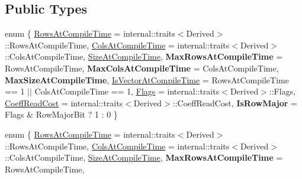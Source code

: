 \subsection*{Public Types}
\begin{DoxyCompactItemize}
\item 
enum \{ \newline
\hyperlink{class_eigen_1_1_skyline_matrix_base_a811ba3961cb927ae5fa84ed278ebceeaa22b71b821112b0ccf61b7317b9ac4cf4}{Rows\+At\+Compile\+Time} = internal\+:\+:traits$<$Derived$>$\+:\+:Rows\+At\+Compile\+Time, 
\hyperlink{class_eigen_1_1_skyline_matrix_base_a811ba3961cb927ae5fa84ed278ebceeaa0bb8b9ae248b86ca53aff754311111e8}{Cols\+At\+Compile\+Time} = internal\+:\+:traits$<$Derived$>$\+:\+:Cols\+At\+Compile\+Time, 
\hyperlink{class_eigen_1_1_skyline_matrix_base_a811ba3961cb927ae5fa84ed278ebceeaacd91cb554fe479f85ab5749902d89217}{Size\+At\+Compile\+Time}, 
{\bfseries Max\+Rows\+At\+Compile\+Time} = Rows\+At\+Compile\+Time, 
\newline
{\bfseries Max\+Cols\+At\+Compile\+Time} = Cols\+At\+Compile\+Time, 
{\bfseries Max\+Size\+At\+Compile\+Time}, 
\hyperlink{class_eigen_1_1_skyline_matrix_base_a811ba3961cb927ae5fa84ed278ebceeaaee4b494f83cfc99369a8364192c33f81}{Is\+Vector\+At\+Compile\+Time} = Rows\+At\+Compile\+Time == 1 $\vert$$\vert$ Cols\+At\+Compile\+Time == 1, 
\hyperlink{class_eigen_1_1_skyline_matrix_base_a811ba3961cb927ae5fa84ed278ebceeaa206a06da6112137d014c4ff4f199f546}{Flags} = internal\+:\+:traits$<$Derived$>$\+:\+:Flags, 
\newline
\hyperlink{class_eigen_1_1_skyline_matrix_base_a811ba3961cb927ae5fa84ed278ebceeaa2f2f2c74314a961757ff965e3b7df794}{Coeff\+Read\+Cost} = internal\+:\+:traits$<$Derived$>$\+:\+:Coeff\+Read\+Cost, 
{\bfseries Is\+Row\+Major} = Flags \& Row\+Major\+Bit ? 1 \+: 0
 \}
\item 
enum \{ \newline
\hyperlink{class_eigen_1_1_skyline_matrix_base_a811ba3961cb927ae5fa84ed278ebceeaa22b71b821112b0ccf61b7317b9ac4cf4}{Rows\+At\+Compile\+Time} = internal\+:\+:traits$<$Derived$>$\+:\+:Rows\+At\+Compile\+Time, 
\hyperlink{class_eigen_1_1_skyline_matrix_base_a811ba3961cb927ae5fa84ed278ebceeaa0bb8b9ae248b86ca53aff754311111e8}{Cols\+At\+Compile\+Time} = internal\+:\+:traits$<$Derived$>$\+:\+:Cols\+At\+Compile\+Time, 
\hyperlink{class_eigen_1_1_skyline_matrix_base_a811ba3961cb927ae5fa84ed278ebceeaacd91cb554fe479f85ab5749902d89217}{Size\+At\+Compile\+Time}, 
{\bfseries Max\+Rows\+At\+Compile\+Time} = Rows\+At\+Compile\+Time, 
\newline
$$
\end{DoxyCompactItemize}
